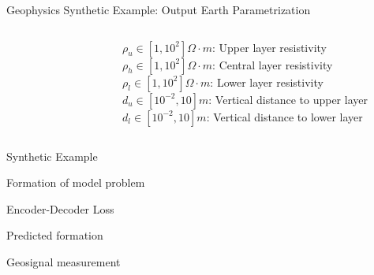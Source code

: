 \begin{frame}{Geophysics Synthetic Example: Output Earth Parametrization}
\begin{columns}
    \begin{column}{0.35\textwidth}
    \begin{figure}[!h]
	\centering
	
	\label{fig:param}
	\end{figure}
    \end{column}
    \begin{column}{0.5\textwidth}
        {\footnotesize $\rho_u \in [1,10^2] \Omega \cdot m$: Upper layer resistivity}\\
        \vspace{0.3cm}
        {\footnotesize $\rho_h \in [1,10^2] \Omega \cdot m$: Central layer resistivity}\\
        \vspace{0.3cm}
        {\footnotesize $\rho_l \in [1,10^2] \Omega \cdot m$: Lower layer resistivity}\\
        \vspace{0.3cm}
        {\footnotesize $d_u \in [10^{-2},10] m$: Vertical distance to upper layer}\\
        \vspace{0.3cm}
        {\footnotesize $d_l \in [10^{-2},10] m$: Vertical distance to lower layer}
    \end{column}
\end{columns}
\end{frame}



\begin{frame}{Synthetic Example}
\begin{center}
{\large Formation of model problem}
\end{center}
\begin{figure}
		\centering
		
	\label{fig:formation_model_1_original}
\end{figure}
\end{frame}


\begin{frame}{Encoder-Decoder Loss}
\begin{center}
Predicted formation
\end{center}
\begin{figure}
		\centering
		
	\label{fig:formation_model_1_original}
\end{figure}
\begin{center}
Geosignal measurement
\end{center}
\begin{figure}
		\centering
		
	\label{fig:formation_model_1_original}
\end{figure}
\end{frame}


